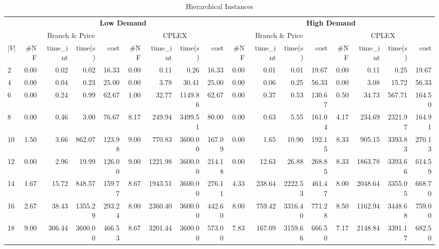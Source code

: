 \documentclass[conference]{IEEEtran}
\begin{document}
\begin{table*}[h]
\begin{center}
\caption{Hierarchical Instances}\label{tab:hier}
\begin{tabular} {l | r r r r | r r r r | r r r r | r r r r }
\hline
      &  \multicolumn{8}{c|}{ \textbf{Low Demand} } & \multicolumn{8}{c}{ \textbf{High Demand}} \\
      &  \multicolumn{4}{c|}{Branch \& Price} & \multicolumn{4}{c|}{CPLEX}    &       \multicolumn{4}{c|}{Branch \& Price} & \multicolumn{4}{c}{CPLEX}               \\  
$|V|$ & \#NF &  time\_int    &  time(s)       &  cost          &  \#NF &  time\_int  &  time(s)       &  cost  & \#NF &  time\_int    &  time(s)       &  cost          &  \#NF &  time\_int  &  time(s)       &  cost \\
\hline      
2&   0.00  &   0.02    &   0.02     &   16.33   & 0.00 & 0.11 & 0.26 & 16.33                 &  0.00  &   0.01    &   0.01     &   19.67   & 0.00 & 0.11 & 0.25 & 19.67                  \\  
4&   0.00  &   0.04    &   0.23     &   25.00   & 0.00 & 3.78 & 30.41 & 25.00                &  0.00  &   0.06    &   0.25     &   56.33   & 0.00 & 3.08 & 15.72 & 56.33                 \\
6&   0.00  &   0.24    &   0.99     &   62.67   & 1.00 & 32.77 & 1149.86 & 62.67            &  0.00  &   0.37    &   0.53     &   130.67  & 0.50 & 34.73 & 567.71 & 164.50          \\
8&   0.00  &   0.46    &   3.00     &   76.67   & 8.17 & 249.94 & 3499.51 & 80.00           &  0.00  &   0.63    &   5.55     &   161.04  & 4.17 & 234.69 & 2321.97 & 164.91          \\
10&  1.50  &   3.66    &   862.07   &   123.98  & 9.00 & 770.83 & 3600.00 & 167.09      &  0.00  &   1.65    &   10.90    &   192.15  & 8.33 & 905.15 & 3393.83 & 270.13        \\
12&  0.00  &   2.96    &   19.99    &   126.00  & 9.00 & 1221.98 & 3600.00 & 214.18    &  0.00  &   12.63   &   26.88    &   268.85  & 8.33 & 1863.78 & 3393.66 & 614.59      \\
14&  1.67  &   15.72   &   848.57   &   159.77  & 8.67 & 1943.51 & 3600.00 & 276.11    &  4.33  &   238.64  &   2222.53  &   461.47  & 8.00 & 2048.64 & 3355.05 & 668.70     \\
16&  2.67  &   38.43   &   1355.29  &   293.24  & 8.00 & 2360.40 & 3600.00 & 442.60   &  8.00  &   759.42  &   3316.40  &   771.28  & 8.50 & 1162.94 & 3448.68 & 759.00     \\
18&  9.00  &   306.44  &   3600.00  &   466.53  & 8.67 & 3201.44 & 3600.00 & 573.00   &  7.83  &   167.09  &   3159.66  &   666.50  & 7.17 & 2148.84 & 3391.17 & 682.50     \\ 
\hline
\end{tabular} 
\end{center}
\end{table*}
\end{document}
